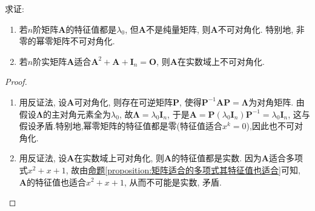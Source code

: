 \documentclass[../../main.tex]{subfiles}%
\begin{document}
\begin{proposition}\label{proposition-0.10}
求证:
\begin{enumerate}[(1)]
\item 若\(n\)阶矩阵\(\boldsymbol{A}\)的特征值都是\(\lambda_0\), 但\(\boldsymbol{A}\)不是纯量矩阵, 则\(\boldsymbol{A}\)不可对角化. 特别地, 非零的幂零矩阵不可对角化.

\item 若\(n\)阶实矩阵\(\boldsymbol{A}\)适合\(\boldsymbol{A}^2 + \boldsymbol{A} + \boldsymbol{I}_n = \boldsymbol{O}\), 则\(\boldsymbol{A}\)在实数域上不可对角化.
\end{enumerate}
\end{proposition}
\begin{proof}
\begin{enumerate}[(1)]
\item 用反证法, 设\(\boldsymbol{A}\)可对角化, 则存在可逆矩阵\(\boldsymbol{P}\), 使得\(\boldsymbol{P}^{-1}\boldsymbol{A}\boldsymbol{P} = \boldsymbol{\Lambda}\)为对角矩阵. 由假设\(\boldsymbol{\Lambda}\)的主对角元素全为\(\lambda_0\), 故\(\boldsymbol{\Lambda} = \lambda_0\boldsymbol{I}_n\), 于是\(\boldsymbol{A} = \boldsymbol{P}(\lambda_0\boldsymbol{I}_n)\boldsymbol{P}^{-1} = \lambda_0\boldsymbol{I}_n\), 这与假设矛盾.特别地,幂零矩阵的特征值都是零(特征值适合$x^k=0$),因此也不可对角化.

\item 用反证法, 设\(\boldsymbol{A}\)在实数域上可对角化, 则\(\boldsymbol{A}\)的特征值都是实数. 因为\(\boldsymbol{A}\)适合多项式\(x^2 + x + 1\), 故由\hyperref[proposition:矩阵适合的多项式其特征值也适合]{命题\ref{proposition:矩阵适合的多项式其特征值也适合}}可知, \(\boldsymbol{A}\)的特征值也适合\(x^2 + x + 1\), 从而不可能是实数, 矛盾.
\end{enumerate}

\end{proof}
\end{document}
